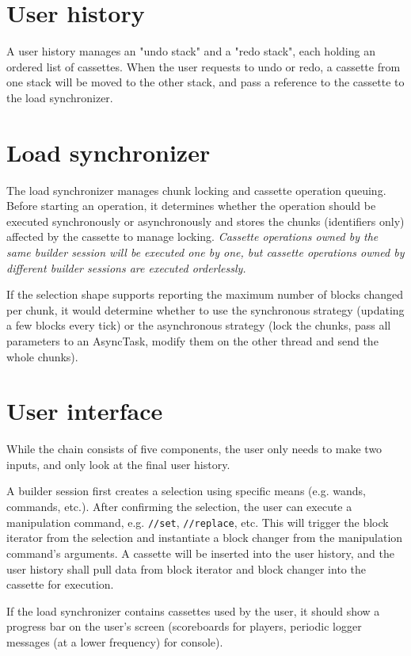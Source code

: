 \documentclass{report}
\begin{document}
			\section{User history}
				A user history manages an "undo stack" and a "redo stack", each holding an ordered list of cassettes.
				When the user requests to undo or redo, a cassette from one stack will be moved to the other stack, and
				pass a reference to the cassette to the load synchronizer.

			\section{Load synchronizer}
				The load synchronizer manages chunk locking and cassette operation queuing. Before starting an
				operation, it determines whether the operation should be executed synchronously or asynchronously and
				stores the chunks (identifiers only) affected by the cassette to manage locking. \emph{Cassette
				operations owned by the same builder session will be executed one by one, but cassette operations owned
				by different builder sessions are executed orderlessly.}

				If the selection shape supports reporting the maximum number of blocks changed per chunk, it would
				determine whether to use the synchronous strategy (updating a few blocks every tick) or the
				asynchronous strategy (lock the chunks, pass all parameters to an AsyncTask, modify them on the other
				thread and send the whole chunks).

			\section{User interface}
				While the chain consists of five components, the user only needs to make two inputs, and only look at
				the final user history.

				A builder session first creates a selection using specific means (e.g. wands, commands, etc.). After
				confirming the selection, the user can execute a manipulation command, e.g. \texttt{//set},
				\texttt{//replace}, etc. This will trigger the block iterator from the selection and instantiate a
				block changer from the manipulation command's arguments. A cassette will be inserted into the user
				history, and the user history shall pull data from block iterator and block changer into the cassette
				for execution.

				If the load synchronizer contains cassettes used by the user, it should show a progress bar on the
				user's screen (scoreboards for players, periodic logger messages (at a lower frequency) for console).
\end{document}
